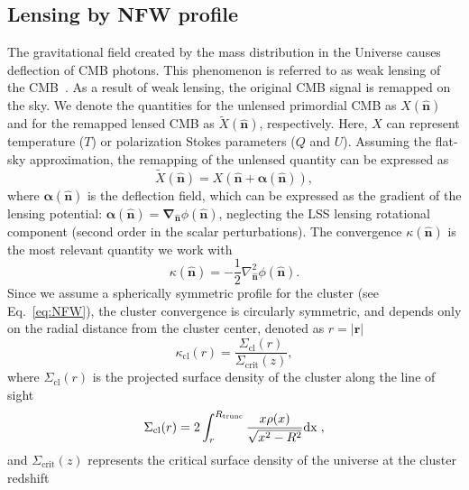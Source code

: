 \documentclass[prd, superscriptaddress, tightenlines, longbibliography, nofootinbib, eqsecnum, amsfonts, amsmath, floatfix, twocolumn, notitlepage]{revtex4-2}
\begin{document}
\subsection{Lensing by NFW profile}

The gravitational field created by the mass distribution in the Universe causes deflection of CMB photons. This phenomenon is referred to as weak lensing of the CMB~\cite{Lewis:2006fu}. As a result of weak lensing, the original CMB signal is remapped on the sky. We denote the quantities for the unlensed primordial CMB as $X (\hat{\mathbf{n}})$  and for the remapped lensed CMB as $\widetilde{X} (\hat{\mathbf{n}})$, respectively. Here, $X$ can represent temperature ($T$) or polarization Stokes parameters ($Q$ and $U$). Assuming the flat-sky approximation, the remapping of the unlensed quantity can be expressed as
\begin{equation}
\widetilde{X} (\hat{\mathbf{n}}) = X (\hat{\mathbf{n}} + \boldsymbol{\alpha}(\hat{\mathbf{n}})),
\end{equation}
where $\boldsymbol{\alpha} (\hat{\mathbf{n}})$ is the deflection field, which can be expressed as the gradient of the lensing potential: $\boldsymbol{\alpha} (\hat{\mathbf{n}}) = \boldsymbol{\nabla}_{\hat{\mathbf{n}}}\phi(\hat{\mathbf{n}})$, neglecting the LSS lensing rotational component (second order in the scalar perturbations). The convergence $\kappa (\hat{\mathbf{n}})$ is the most relevant quantity we work with~\cite{Lewis:2006fu}
\begin{equation}
\kappa(\hat{\mathbf{n}}) = -\frac{1}{2}\nabla^2_{\hat{\mathbf{n}}}\phi(\hat{\mathbf{n}}).
\end{equation}
Since we assume a spherically symmetric profile for the cluster (see Eq.~\ref{eq:NFW}), the cluster convergence is circularly symmetric, and depends only on the radial distance from the cluster center, denoted as $r = |\mathbf{r}|$~\cite{Zubeldia:2019brr, Wright:1999jc}
\begin{equation}
\kappa_{\text{cl}}(r) = \frac{\Sigma_{\text{cl}}(r)}{\Sigma_{\text{crit}}(z)},
\end{equation}
where $\Sigma_{\text{cl}}(r)$ is the projected surface density of the cluster along the line of sight~\cite{Zubeldia:2019brr, Geach:2017crt}
\begin{equation}
\Sigma_{\rm{cl}}(r) = 2 \int_{r}^{R_{\rm{trunc}}}\frac{x\rho(x)}{\sqrt{x^2-R^2}} \rm{d} x \; ,
\end{equation}
and $\Sigma_{\text{crit}}(z)$ represents the critical surface density of the universe at the cluster redshift~\cite{Zubeldia:2019brr, Wright:1999jc}
\end{document}
